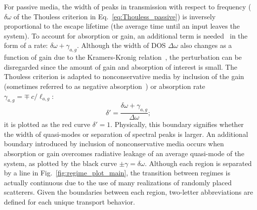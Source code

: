 For passive media, the width of peaks in transmission with respect to frequency ($\delta \omega$ of the Thouless criterion in Eq.~\ref{eq:Thouless_passive}) is inversely proportional to the escape lifetime (the average time until an input leaves the system). To account for absorption or gain, an additional term is needed~\cite{2005_Yamilov_correlations} in the form of a rate: 
$\delta \omega +\gamma_{a,g}$.
Although the width of DOS $\Delta \omega$ also changes as a function of gain due to the Kramers-Kronig relation~\cite{1999_Jackson}, the perturbation can be disregarded since the amount of gain and absorption of interest is small. 
The Thouless criterion is adapted to nonconservative media by inclusion of the gain (sometimes referred to as negative absorption~\cite{1968_Letokhov}) or absorption rate $\gamma_{a,g}=\mp~c/\ell_{a,g}$:
\begin{equation}
\delta'=\frac{\delta \omega +\gamma_{a,g}}{\Delta \omega};
\label{eq:generalized_thouless}
\end{equation}
it is plotted as the red curve $\delta'=1$. Physically, this boundary signifies whether the width of quasi-modes or separation of spectral peaks is larger. An additional boundary introduced by inclusion of nonconservative media occurs when absorption or gain overcomes radiative leakage of an average quasi-mode of the system, as plotted by the black curve $\pm \gamma = \delta \omega$. %
Although each region is separated by a line in Fig.~\ref{fig:regime_plot_main}, the transition between regimes is actually continuous due to the use of many realizations of randomly placed scatterers. Given the boundaries between each region, two-letter abbreviations are defined for each unique transport behavior.

